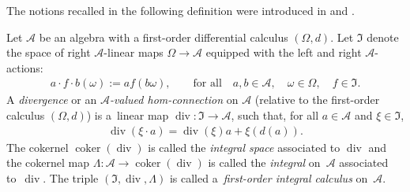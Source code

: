 \documentclass[pdftex]{sigma}
\numberwithin{equation}{section}
\begin{document}
The notions recalled in the following def\/inition were introduced in \cite{Brz:con} and \cite{BrzElK:int}.
\begin{Definition}\label{def.div}
Let ${\mathcal{A}}$ be an algebra with a f\/irst-order dif\/ferential calculus $(\Omega, d)$. Let ${\mathfrak I}$ denote the space of right ${\mathcal{A}}$-linear maps $\Omega \to {\mathcal{A}}$ equipped with the left and right ${\mathcal{A}}$-actions:
\begin{gather*}
a\cdot f\cdot b(\omega) := af(b\omega), \qquad \mbox{for all}\quad a,b\in {\mathcal{A}}, \quad \omega\in \Omega,\quad f\in {\mathfrak I}.
\end{gather*}
A {\em divergence} or an {\em ${\mathcal{A}}$-valued hom-connection} on ${\mathcal{A}}$ (relative to the f\/irst-order calculus $(\Omega, d)$) is a~linear map
$\operatorname{div} \colon {\mathfrak I} \to {\mathcal{A}}$, such that, for all $a\in {\mathcal{A}}$ and $\xi\in {\mathfrak I}$,
\begin{gather*}%
\operatorname{div}(\xi\cdot a) = \operatorname{div}(\xi) a + \xi(d(a)).
\end{gather*}
The cokernel $\operatorname{coker} (\operatorname{div})$ is called the {\em integral space} associated to $\operatorname{div}$ and the cokernel map $\Lambda\colon {\mathcal{A}} \to \operatorname{coker} (\operatorname{div})$ is called the {\em integral} on~${\mathcal{A}}$ associated to~$\operatorname{div}$. The triple $({\mathfrak I}, \operatorname{div},\Lambda)$ is called a~{\em first-order integral calculus} on~${\mathcal{A}}$.
\end{Definition}
\end{document}
